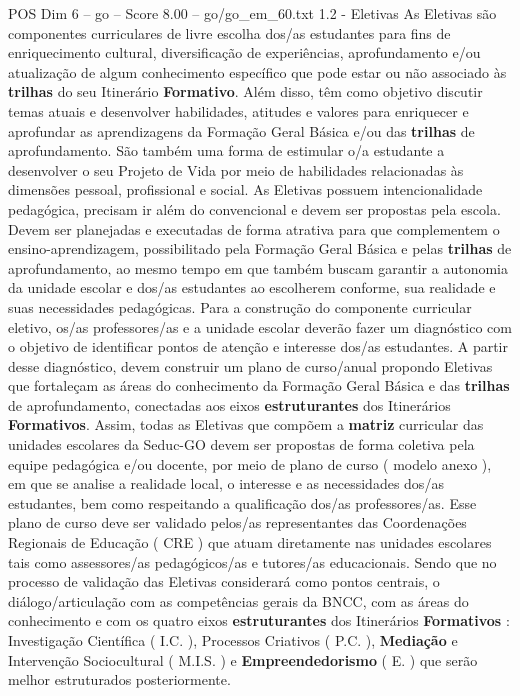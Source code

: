 \begin{textsample}{POS Dim 6 – go – Score 8.00 – go/go\_em\_60.txt}  \label{ex:f6_pos_115}
1.2 - Eletivas As Eletivas são componentes curriculares de livre escolha dos/as estudantes para fins de enriquecimento cultural, diversificação de experiências, aprofundamento e/ou atualização de algum conhecimento específico que pode estar ou não associado às \textbf{trilhas} do seu Itinerário \textbf{Formativo}.
Além disso, têm como objetivo discutir temas atuais e desenvolver habilidades, atitudes e valores para enriquecer e aprofundar as aprendizagens da Formação Geral Básica e/ou das \textbf{trilhas} de aprofundamento.
São também uma forma de estimular o/a estudante a desenvolver o seu Projeto de Vida por meio de habilidades relacionadas às dimensões pessoal, profissional e social.
As Eletivas possuem intencionalidade pedagógica, precisam ir além do convencional e devem ser propostas pela escola.
Devem ser planejadas e executadas de forma atrativa para que complementem o ensino-aprendizagem, possibilitado pela Formação Geral Básica e pelas \textbf{trilhas} de aprofundamento, ao mesmo tempo em que também buscam garantir a autonomia da unidade escolar e dos/as estudantes ao escolherem conforme, sua realidade e suas necessidades pedagógicas.
Para a construção do componente curricular eletivo, os/as professores/as e a unidade escolar deverão fazer um diagnóstico com o objetivo de identificar pontos de atenção e interesse dos/as estudantes.
A partir desse diagnóstico, devem construir um plano de curso/anual propondo Eletivas que fortaleçam as áreas do conhecimento da Formação Geral Básica e das \textbf{trilhas} de aprofundamento, conectadas aos eixos \textbf{estruturantes} dos Itinerários \textbf{Formativos}.
Assim, todas as Eletivas que compõem a \textbf{matriz} curricular das unidades escolares da Seduc-GO devem ser propostas de forma coletiva pela equipe pedagógica e/ou docente, por meio de plano de curso ( modelo anexo ), em que se analise a realidade local, o interesse e as necessidades dos/as estudantes, bem como respeitando a qualificação dos/as professores/as.
Esse plano de curso deve ser validado pelos/as representantes das Coordenações Regionais de Educação ( CRE ) que atuam diretamente nas unidades escolares tais como assessores/as pedagógicos/as e tutores/as educacionais.
Sendo que no processo de validação das Eletivas considerará como pontos centrais, o diálogo/articulação com as competências gerais da BNCC, com as áreas do conhecimento e com os quatro eixos \textbf{estruturantes} dos Itinerários \textbf{Formativos} : Investigação Científica ( I.C. ), Processos Criativos ( P.C. ), \textbf{Mediação} e Intervenção Sociocultural ( M.I.S. ) e \textbf{Empreendedorismo} ( E. ) que serão melhor estruturados posteriormente.

\end{textsample}
